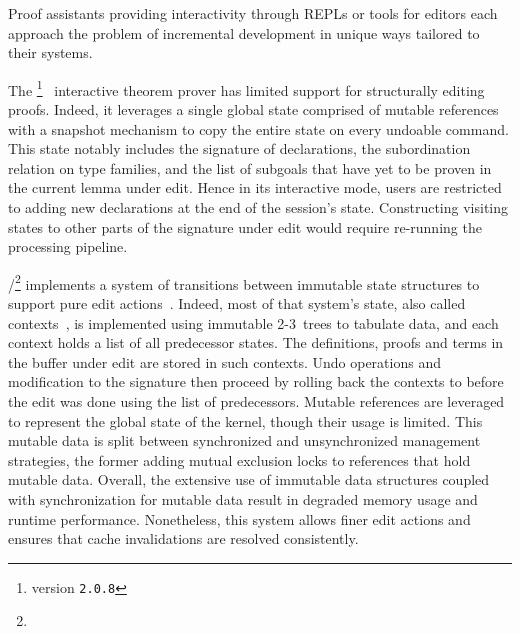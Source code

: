 Proof assistants providing interactivity through \acp{REPL} or tools for editors each approach the problem of incremental development in unique ways tailored to their systems.

The \Abella\footnote{\Abella version \texttt{2.0.8}}~\cite{baelde2014abella} interactive theorem prover has limited support for structurally editing proofs.
Indeed, it leverages a single global state comprised of mutable references with a snapshot mechanism to copy the entire state on every undoable command.
This state notably includes the signature of declarations, the subordination relation on type families, and the list of subgoals that have yet to be proven in the current lemma under edit.
Hence in its interactive mode, \Abella users are restricted to adding new declarations at the end of the session's state.
Constructing visiting states to other parts of the signature under edit would require re-running the processing pipeline.

\Isabelle/\Isar\footnote{} implements a system of transitions between immutable state structures to support pure edit actions~\cite{wenzel2023isabelleimpl, wenzel2023isabelleisarref, wenzel2023isabellesys}.
Indeed, most of that system's state, also called contexts~\cite{ballarin2006interpretation}, is implemented using immutable 2-3~trees to tabulate data, and each context holds a list of all predecessor states.
The definitions, proofs and terms in the buffer under edit are stored in such contexts.
Undo operations and modification to the signature then proceed by rolling back the contexts to before the edit was done using the list of predecessors.
Mutable references are leveraged to represent the global state of the kernel, though their usage is limited.
This mutable data is split between synchronized and unsynchronized management strategies, the former adding mutual exclusion locks to references that hold mutable data.
Overall, the extensive use of immutable data structures coupled with synchronization for mutable data result in degraded memory usage and runtime performance.
Nonetheless, this system allows finer edit actions and ensures that cache invalidations are resolved consistently.

